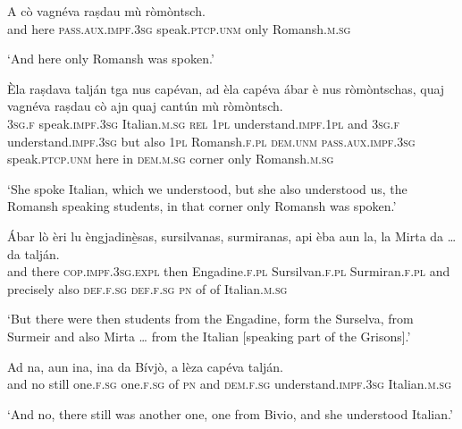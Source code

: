 \begin{linenumbers}
\gll    A cò vagnéva raṣdau mù ròmòntsch.\\
and here \textsc{pass.aux.impf.3sg} speak.\textsc{ptcp.unm} only Romansh.\textsc{m.sg}\\
\end{linenumbers}
\medskip
\glt `And here only Romansh was spoken.'
\medskip

\begin{linenumbers}
\gll    Èla raṣdava talján tga nus capévan, ad èla capéva ábar è nus ròmòntschas, quaj vagnéva raṣdau cò ajn quaj cantún mù ròmòntsch.\\
 \textsc{3sg.f} speak.\textsc{impf.3sg} Italian.\textsc{m.sg} \textsc{rel} \textsc{1pl} understand.\textsc{impf.1pl} and \textsc{3sg.f} understand.\textsc{impf.3sg} but also \textsc{1pl} Romansh.\textsc{f.pl} \textsc{dem.unm} \textsc{pass.aux.impf.3sg} speak.\textsc{ptcp.unm} here in  \textsc{dem.m.sg} corner only Romansh.\textsc{m.sg}\\
\end{linenumbers}
\medskip
\glt `She spoke Italian, which we understood, but she also understood us, the Romansh speaking students, in that corner only Romansh was spoken.'
\medskip

\begin{linenumbers}
\gll    Ábar lò èri lu  èngjadinè̱sas, sursilvanas, surmiranas, api èba aun la, la Mirta da … da talján.\\
and there \textsc{cop.impf.3sg.expl} then Engadine.\textsc{f.pl} Sursilvan.\textsc{f.pl} Surmiran.\textsc{f.pl} and precisely also \textsc{def.f.sg} \textsc{def.f.sg} \textsc{pn} of {} of Italian.\textsc{m.sg}\\
\end{linenumbers}
\medskip
\glt `But there were then students from the Engadine, form the Surselva, from Surmeir and also Mirta … from the Italian [speaking part of the Grisons].'
\medskip

\begin{linenumbers}
\gll    Ad na, aun ina, ina da Bívjò, a lèza capéva talján.\\
and no still one.\textsc{f.sg} one.\textsc{f.sg} of \textsc{pn} and \textsc{dem.f.sg} understand.\textsc{impf.3sg} Italian.\textsc{m.sg}\\
\end{linenumbers}
\medskip
\glt `And no, there still was another one, one from Bivio, and she understood Italian.'
\medskip

